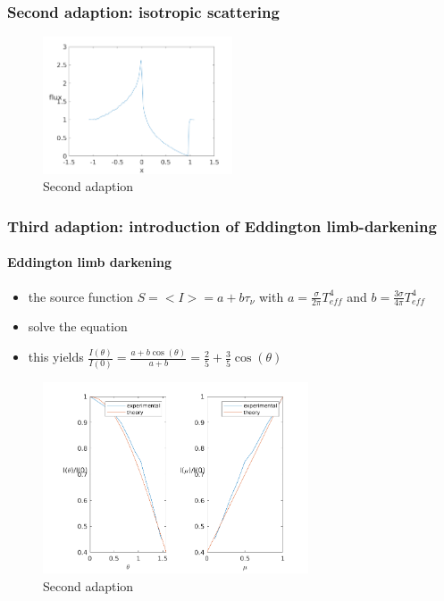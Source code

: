 \documentclass[10pt,a4paper]{article}
\begin{document}
\subsubsection{Second adaption: isotropic scattering}
\begin{figure}[!htp]
\centering
\includegraphics[width=0.5\textwidth]{../../introductory_exercises/P_Cygni_profile_UV_resonance/npot6xk0100alpha0beta1test2.png}
\caption{Second adaption}
\end{figure}

\newpage
\subsubsection{Third adaption: introduction of Eddington limb-darkening}
\paragraph{Eddington limb darkening}
\begin{itemize}
\item the source function $S= <I> = a + b\tau_{\nu}$ with $a= \frac{\sigma}{2 \pi}T_{eff}^4$ and $b = \frac{3 \sigma}{4 \pi}T_{eff}^4$
\item solve the equation
\item this yields $\frac{I(\theta)}{I(0)} = \frac{a+b\cos(\theta)}{a+b} = \frac{2}{5} + \frac{3}{5}\cos(\theta)$
\end{itemize}
\begin{figure}[!htp]
\centering
\includegraphics[width=0.7\textwidth]{../../introductory_exercises/P_Cygni_profile_UV_resonance/Eddington_limb_darkening.png}
\caption{Second adaption}
\end{figure}
\end{document}
